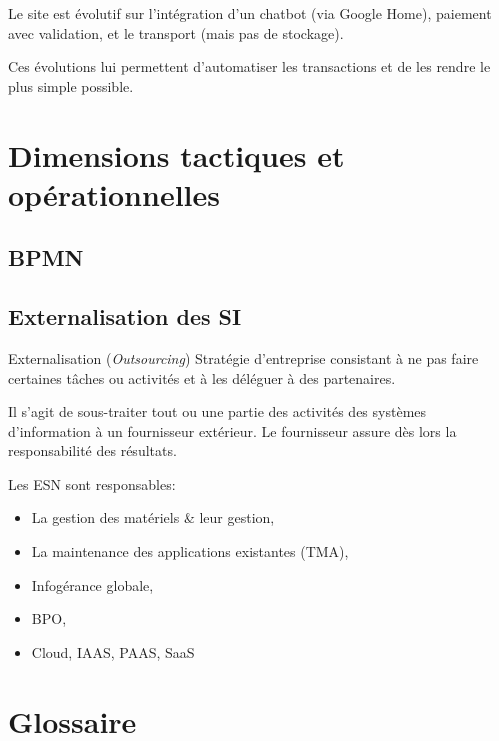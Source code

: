 \documentclass[10pt,a4paper,french]{article}
\begin{document}
Le site est évolutif sur l'intégration d'un chatbot (via Google Home), paiement avec validation, et le transport (mais pas de stockage).

Ces évolutions lui permettent d'automatiser les transactions et de les rendre le plus simple possible.

\section{Dimensions tactiques et opérationnelles}

\subsection{BPMN}

\subsection{Externalisation des SI}

\begin{cquote}{Externalisation (\textit{Outsourcing})}
Stratégie d'entreprise consistant à ne pas faire certaines tâches ou activités et à les déléguer à des partenaires.
\end{cquote}

Il s'agit de sous-traiter tout ou une partie des activités des systèmes d'information à un fournisseur extérieur. Le fournisseur assure dès lors la responsabilité des résultats.

Les ESN sont responsables:
\begin{itemize}
\item La gestion des matériels \& leur gestion,
\item La maintenance des applications existantes (TMA),
\item Infogérance globale,
\item BPO,
\item Cloud, IAAS, PAAS, SaaS
\end{itemize}





\appendix
\section{Glossaire}
\end{document}
